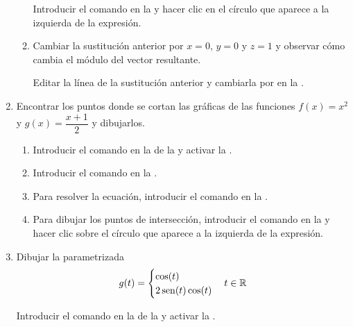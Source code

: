 \begin{enumerate}
\begin{enumerate}
            \begin{indication}
            Introducir el comando \command{|\$|} en la  y hacer clic en el círculo que aparece a la izquierda de la expresión.
            \end{indication}
      \item Cambiar la sustitución anterior por $x=0$, $y=0$ y $z=1$ y observar cómo cambia el módulo del vector resultante.
            \begin{indication}
            Editar la línea de la sustitución anterior y cambiarla por   en la .
            \end{indication}
      \end{enumerate}

\item Encontrar los puntos donde se cortan las gráficas de las funciones $f(x)=x^2$ y $g(x)=\dfrac{x+1}{2}$ y dibujarlos.
      \begin{enumerate}
      \item Introducir el comando  en la  de la  y activar la .
      \item Introducir el comando  en la .
      \item Para resolver la ecuación, introducir el comando  en la .
      \item Para dibujar los puntos de intersección, introducir el comando  en la  y hacer clic sobre el círculo que aparece a la izquierda de la expresión.
      \end{enumerate}

\item Dibujar la parametrizada
      \[
      g(t)=
      \begin{cases}
      \cos(t) \\
      2\operatorname{sen}(t)\cos(t)
      \end{cases}
      t\in \mathbb{R}
      \]

      \begin{indication}
      Introducir el comando  en la  de la  y activar la .
      \end{indication}


\end{enumerate}

